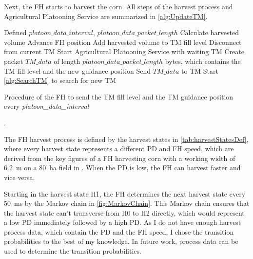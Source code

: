 Next, the \ac{FH} starts to harvest the corn.
All steps of the harvest process and Agricultural Platooning Service are summarized in
\autoref{alg:UpdateTM}.

\begin{algorithm}
\begin{algorithmic}[1]
\REQUIRE Defined $platoon\_data\_interval$, $platoon\_data\_packet\_length$
\STATE Calculate harvested volume
\STATE Advance \ac{FH} position
\STATE Add harvested volume to \ac{TM} fill level
    \STATE Disconnect from current \ac{TM}
	\STATE Start Agricultural Platooning Service with waiting \ac{TM}
\ELSE
	\STATE Create packet $TM\_data$ of length $platoon\_data\_packet\_length$ bytes, which contains the \ac{TM} fill level and the new guidance position
	\STATE Send $TM\_data$ to \ac{TM}
		\STATE Start \autoref{alg:SearchTM} to search for new \ac{TM}
	\ENDIF
\ENDIF
\end{algorithmic}
\caption{Procedure of the \acf{FH} to send the \acf{TM} fill level and the \ac{TM} guidance position every
\textit{platoon\_data\_interval}}.
\label{alg:UpdateTM}
\end{algorithm}

The FH harvest process is defined by the harvest states in \autoref{tab:harvestStatesDef},
where every harvest state represents a different \ac{PD} and \ac{FH} speed, which are derived from the key figures of a
\ac{FH} harvesting corn with a working width of \SI{6.2}{\meter} on a \SI{80}{\hectare} field in \cite{faustzahlen2018}.
When the \ac{PD} is low, the \ac{FH} can harvest faster and vice versa.

Starting in the harvest state H1, the \ac{FH} determines the next harvest state every \SI{50}{\milli\second}
by the Markov chain in \autoref{fig:MarkovChain}.
This Markov chain ensures that the harvest state can't transverse from H0 to H2 directly, which would represent
a low \ac{PD} immediately followed by a high \ac{PD}.
As I do not have enough harvest process data, which contain the \ac{PD} and the \ac{FH} speed,
I chose the transition probabilities to the best of my knowledge.
In future work, process data can be used to determine
the transition probabilities.

